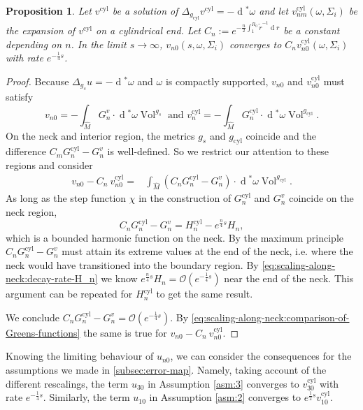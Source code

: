 \documentclass[preprint,12pt]{elsarticle}
\numberwithin{table}{section}
\newtheorem{proposition}[lemma]{Proposition}
\newcommand{\Vol}{\operatorname{Vol}}
\renewcommand{\d}{\operatorname{d}\!}
\renewcommand{\O}{\mathcal{O}}
\begin{document}
\begin{proposition}
	Let $v^{\mathrm{cyl}}$ be a solution of $\Delta_{g_{\mathrm{cyl}}} v^{\mathrm{cyl}} = - \d^* \omega$ and let $v_{nm}^{\mathrm{cyl}}(\omega, \Sigma_i)$ be the expansion of $v^{\mathrm{cyl}}$ on a cylindrical end.
	Let $C_n := e^{- \frac{n}{2} \int_{1}^{R_0} \tilde{r}^{-1} \d r}$ be a constant depending on $n$.
	In the limit $s \to \infty$, $v_{n0}(s, \omega, \Sigma_i)$ converges to $C_n v^{\mathrm{cyl}}_{n0}(\omega, \Sigma_i)$ with rate $e^{- \frac{1}{4}s}$.
\end{proposition}
\begin{proof}
	Because $\Delta_{g_s} u = - \d^* \omega$ and $\omega$ is compactly supported, $v_{n0}$ and $v_{n0}^{\mathrm{cyl}}$ must satisfy
	$$
	v_{n0} = - \int_{\hat{M}} G^v_n \cdot \d^* \omega \Vol^{g_s} \text{ and } v^{\mathrm{cyl}}_n = - \int_{\hat{M}} G^{\mathrm{cyl}}_n \cdot \d^* \omega \Vol^{g_{\mathrm{cyl}}}.
	$$
	On the neck and interior region, the metrics $g_s$ and $g_{\mathrm{cyl}}$ coincide and the difference $C_m G_n^{\mathrm{cyl}} - G_n^v$ is well-defined. So we restrict our attention to these regions and consider
	\begin{align}
		\label{eq:scaling-along-neck:comparison-of-Greens-functions}
		v_{n0} - C_n \: v^{\mathrm{cyl}}_{n0} =& 
		\int_{\hat{M}} (C_n G^{\mathrm{cyl}}_n - G^v_n) \cdot \d^* \omega \Vol^{g_{\mathrm{cyl}}}.
	\end{align}
	As long as the step function $\chi$ in the construction of $G^{\mathrm{cyl}}_n$ and $G^v_n$ coincide on the neck region,
	$$
	C_n G^{\mathrm{cyl}}_n - G^v_n 
	= H^{\mathrm{cyl}}_n - e^{\frac{n}{4}s} H_n,
	$$
	which is a bounded harmonic function on the neck. By the maximum principle $C_n G^{\mathrm{cyl}}_n - G^v_n$ must attain its extreme values at the end of the neck, i.e. where the neck would have transitioned into the boundary region. By \cref{eq:scaling-along-neck:decay-rate-H_n} we know $e^{\frac{n}{4}s} H_n = \O(e^{- \frac{1}{4}s })$ near the end of the neck. This argument can be repeated for $H^{\mathrm{cyl}}_n$ to get the same result.
	
	We conclude $C_n G^{\mathrm{cyl}}_n - G^v_n = \O(e^{- \frac{1}{4}s})$. By \cref{eq:scaling-along-neck:comparison-of-Greens-functions} the same is true for $v_{n0} - C_n \: v^{\mathrm{cyl}}_{n0}$.
\end{proof}

Knowing the limiting behaviour of $u_{n0}$, we can consider the consequences for the assumptions we made in \cref{subsec:error-map}. Namely, taking account of the different rescalings, the term $u_{30}$ in Assumption \ref{asm:3} converges to $v^{\mathrm{cyl}}_{30}$ with rate $e^{-\frac{1}{4}s}$. Similarly, the term $u_{10}$ in Assumption \ref{asm:2} converges to $e^{\frac{1}{2}s} v^{\mathrm{cyl}}_{10}$.
\end{document}
